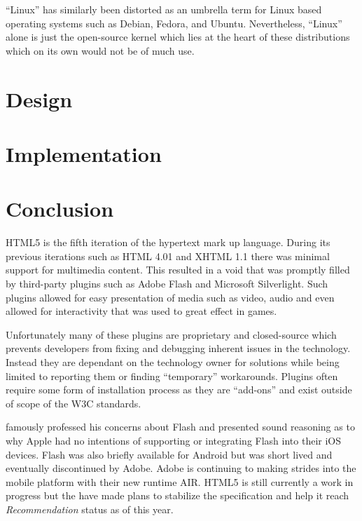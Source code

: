 \documentclass[final]{cmpreport}
\begin{document}
``Linux'' has similarly been distorted as an umbrella term for Linux based operating systems such as Debian, Fedora, and Ubuntu. Nevertheless, ``Linux'' alone is just the open-source kernel which lies at the heart of these distributions which on its own would not be of much use.

\section{Design}

\section{Implementation}

\section{Conclusion}
HTML5 is the fifth iteration of the hypertext mark up language. During its previous iterations such as HTML 4.01 and XHTML 1.1 there was minimal support for multimedia content. This resulted in a void that was promptly filled by third-party plugins such as Adobe Flash and Microsoft Silverlight. Such plugins allowed for easy presentation of media such as video, audio and even allowed for interactivity that was used to great effect in games.

Unfortunately many of these plugins are proprietary and closed-source which prevents developers from fixing and debugging inherent issues in the technology. Instead they are dependant on the technology owner for solutions while being limited to reporting them or finding ``temporary'' workarounds. Plugins often require some form of installation process as they are ``add-ons'' and exist outside of scope of the W3C standards.

\citet{Jobs} famously professed his concerns about Flash and presented sound reasoning as to why Apple had no intentions of supporting or integrating Flash into their iOS devices. Flash was also briefly available for Android but was short lived and eventually discontinued by Adobe. Adobe is continuing to making strides into the mobile platform with their new runtime AIR\footnotemark. HTML5 is still currently a work in progress but the \cite{W3C} have made plans to stabilize the specification and help it reach \textit{Recommendation\footnotemark} status as of this year.

\end{document}
